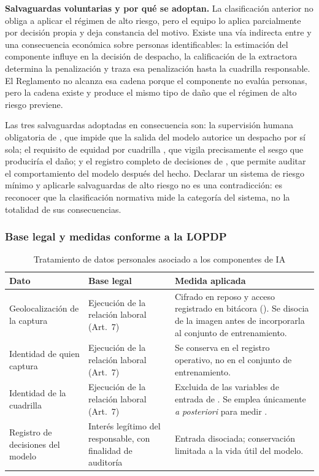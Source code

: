 \noindent
\textbf{Salvaguardas voluntarias y por qué se adoptan.} La clasificación anterior no obliga a aplicar
el régimen de alto riesgo, pero el equipo lo aplica parcialmente por decisión propia y deja
constancia del motivo. Existe una vía indirecta entre  y una consecuencia económica sobre
personas identificables: la estimación del componente influye en la decisión de despacho, la
calificación de la extractora determina la penalización y  traza esa penalización hasta la
cuadrilla responsable. El Reglamento no alcanza esa cadena porque el componente no evalúa personas,
pero la cadena existe y produce el mismo tipo de daño que el régimen de alto riesgo previene.

Las tres salvaguardas adoptadas en consecuencia son: la supervisión humana obligatoria de
, que impide que la salida del modelo autorice un despacho por sí sola; el requisito de
equidad por cuadrilla , que vigila precisamente el sesgo que produciría el daño; y el
registro completo de decisiones de , que permite auditar el comportamiento del modelo
después del hecho. Declarar un sistema de riesgo mínimo y aplicarle salvaguardas de alto riesgo no es
una contradicción: es reconocer que la clasificación normativa mide la categoría del sistema, no la
totalidad de sus consecuencias.

\subsubsection*{Base legal y medidas conforme a la LOPDP}

\begin{table}[H]
\centering\footnotesize
\caption{Tratamiento de datos personales asociado a los componentes de IA}
\label{tab:lopdp-ia-inf}
\begin{tabular}{|L{3.4cm}|L{3.6cm}|L{8.2cm}|}
\hline
{}\textbf{Dato} & \textbf{Base legal} & \textbf{Medida aplicada}\\ \hline
Geolocalización de la captura & Ejecución de la relación laboral (Art.~7) & Cifrado en reposo y acceso registrado en bitácora (). Se disocia de la imagen antes de incorporarla al conjunto de entrenamiento.\\ \hline
Identidad de quien captura & Ejecución de la relación laboral (Art.~7) & Se conserva en el registro operativo, no en el conjunto de entrenamiento.\\ \hline
Identidad de la cuadrilla & Ejecución de la relación laboral (Art.~7) & Excluida de las variables de entrada de . Se emplea únicamente \emph{a posteriori} para medir .\\ \hline
Registro de decisiones del modelo & Interés legítimo del responsable, con finalidad de auditoría & Entrada disociada; conservación limitada a la vida útil del modelo.\\ \hline
\end{tabular}
\end{table}

